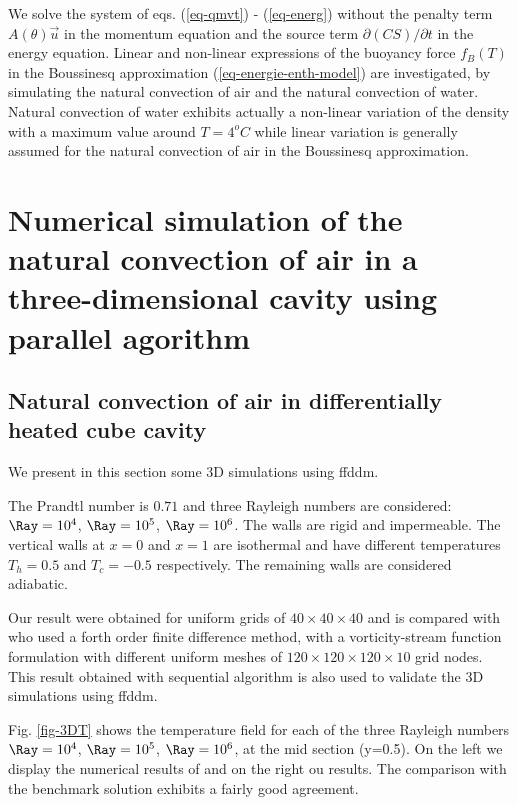 We solve the system of eqs. (\ref{eq-qmvt}) - (\ref{eq-energ}) without the penalty term $A(\theta) \vec u$ in the momentum equation and the source term $\partial (CS)/\partial t$ in the energy equation.
Linear and non-linear expressions of the buoyancy force $f_B(T)$ in the Boussinesq approximation (\ref{eq-energie-enth-model}) are investigated, by simulating the natural convection of air and the natural convection of water.
Natural convection of water exhibits actually a non-linear variation of the density with a maximum value around $T=4^o C$ while linear variation is generally assumed for the natural convection of air in the Boussinesq approximation.

\section{Numerical simulation of the natural convection of air in a three-dimensional cavity using parallel agorithm}\label{sec: natconv-air-3D}

\subsection{Natural convection of air in differentially heated cube cavity}
We present in this section some 3D simulations using ffddm.

The Prandtl number is $0.71$ and three Rayleigh numbers are considered:  $\Ray=10^4$, $\Ray=10^5$, $\Ray=10^6$. The walls are rigid and impermeable. The vertical walls at $x=0$ and $x=1$ are isothermal and have different temperatures $T_h=0.5$ and $T_c=-0.5$ respectively. The remaining walls are considered adiabatic. %
 
Our result were obtained for uniform grids of $  40 \times 40 \times 40$ and is compared with \cite{Wakashima-2004} who used a forth order finite difference method, with a vorticity-stream function formulation with different uniform meshes of  $120 \times 120 \times 120 \times 10$ grid nodes. 
This result obtained with sequential algorithm is also used to validate the 3D simulations using ffddm.

Fig. \ref{fig-3DT} shows the temperature field for each of the three Rayleigh numbers $\Ray = 10^4$, $\Ray = 10^5$, $\Ray = 10^6$, at the mid section (y=0.5).
On the left we display the numerical results of \cite{Wakashima-2004} and on the right ou results.
The comparison with the benchmark solution exhibits a fairly good agreement.

